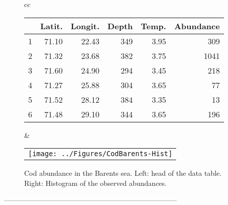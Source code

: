 \begin{figure}[ht]
  \begin{center}
    \begin{tabular}{cc}
      \begin{tabular}{l|rrrrr} 
        & Latit. & Longit. & Depth & Temp. & Abundance \\ 
        \hline 
        1 & 71.10 & 22.43 & 349 & 3.95 & 309 \\ 
        2 & 71.32 & 23.68 & 382 & 3.75 & 1041 \\ 
        3 & 71.60 & 24.90 & 294 & 3.45 & 218 \\ 
        4 & 71.27 & 25.88 & 304 & 3.65 & 77 \\ 
        5 & 71.52 & 28.12 & 384 & 3.35 & 13 \\ 
        6 & 71.48 & 29.10 & 344 & 3.65 & 196 
      \end{tabular}      
      &
      \begin{tabular}{c} 
        \texttt{[image: ../Figures/CodBarents-Hist]}
      \end{tabular}
    \end{tabular}
  \end{center}
  \caption{Cod abundance in the Barents sea. Left: head of the data table. Right: Histogram of the observed abundances. \label{fig:ZIPcodBarentsData}}
\end{figure}

--------------------------------------------------------------------------
